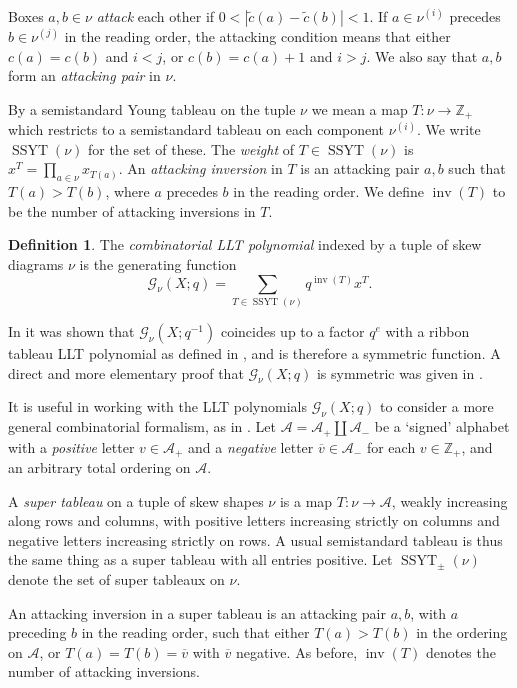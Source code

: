 \documentclass[12pt]{amsart}
\theoremstyle{definition}
\newtheorem{defn}[thm]{Definition}
\theoremstyle{remark}
\newcommand{\ZZ}{{\mathbb Z}}
\newcommand{\Acal}{{\mathcal A}}
\newcommand{\Gcal}{{\mathcal G}}
\newcommand{\ctild}{\tilde{c}}
\DeclareMathOperator{\inv}{inv}
\DeclareMathOperator{\SSYT}{SSYT}
\begin{document}
Boxes $a,b\in \nu $ {\em attack} each other if $0<|\ctild (a)-\ctild
(b)|<1$.  If $a\in \nu ^{(i)}$ precedes $b\in \nu ^{(j)}$ in the
reading order, the attacking condition means that either $c(a)=c(b)$
and $i<j$, or $c(b)=c(a)+1$ and $i>j$.  We also say that $a,b$ form an
{\em attacking pair} in $\nu $.

By a semistandard Young tableau on the tuple $\nu $ we mean a map
$T\colon \nu \rightarrow \ZZ _{+}$ which restricts to a semistandard
tableau on each component $\nu ^{(i)}$.  We write $\SSYT (\nu )$ for
the set of these.  The {\em weight} of $T\in \SSYT (\nu )$ is $x^{T} =
\prod _{a\in \nu }x_{T(a)}$.  An {\em attacking inversion} in $T$ is
an attacking pair $a,b$ such that $T(a)>T(b)$, where $a$ precedes $b$
in the reading order.  We define $\inv (T)$ to be the number of
attacking inversions in $T$.

\begin{defn}\label{def:G-nu}
The {\em combinatorial LLT polynomial} indexed by a tuple of skew
diagrams $\nu $ is the generating function
\begin{equation}\label{e:G-nu}
\Gcal_{\nu }(X;q) = \sum _{T\in \SSYT (\nu )}q^{\inv (T)}x^{T}.
\end{equation}
\end{defn}
In \cite{HaHaLoReUl05} it was shown that $\Gcal_{\nu }(X;q^{-1})$
coincides up to a factor $q^{e}$ with a ribbon tableau LLT polynomial
as defined in \cite{LaLeTh97}, and is therefore a symmetric function.
A direct and more elementary proof that $\Gcal_{\nu }(X;q)$ is symmetric
was given in \cite{HaHaLo05}.

It is useful in working with the LLT polynomials $\Gcal _{\nu }(X;q)$
to consider a more general combinatorial formalism, as in \cite[\S
10]{HaHaLo05}.  Let $\Acal = \Acal _{+} \coprod \Acal _{-}$ be a
`signed' alphabet with a {\em positive} letter $v\in \Acal _{+}$ and a
{\em negative} letter $\overline{v}\in \Acal _{-}$ for each $v\in \ZZ
_{+}$, and an arbitrary total ordering on $\Acal $.
 
A {\em super tableau} on a tuple of skew shapes $\nu $ is a map
$T\colon \nu \rightarrow \Acal $, weakly increasing along rows and
columns, with positive letters increasing strictly on columns and
negative letters increasing strictly on rows.  A usual semistandard
tableau is thus the same thing as a super tableau with all entries
positive.  Let $\SSYT _{\pm }(\nu )$ denote the set of super tableaux
on $\nu $.

An attacking inversion in a super tableau is an attacking pair $a,b$,
with $a$ preceding $b$ in the reading order, such that either
$T(a)>T(b)$ in the ordering on $\Acal $, or $T(a)=T(b) = \overline{v}$
with $\overline{v}$ negative.  As before, $\inv (T)$ denotes the
number of attacking inversions.
\end{document}
